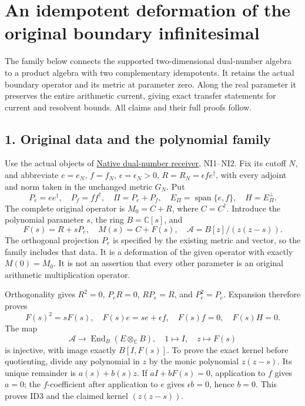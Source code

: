 \documentclass[
]{article}
\author{}
\date{}
\begin{document}
{
\setcounter{tocdepth}{3}
\tableofcontents
}
\section{An idempotent deformation of the original boundary
infinitesimal}\label{an-idempotent-deformation-of-the-original-boundary-infinitesimal}

The family below connects the supported two-dimensional dual-number
algebra to a product algebra with two complementary idempotents. It
retains the actual boundary operator and its metric at parameter zero.
Along the real parameter it preserves the entire arithmetic current,
giving exact transfer statements for current and resolvent bounds. All
claims and their full proofs follow.

\subsection{1. Original data and the polynomial
family}\label{original-data-and-the-polynomial-family}

Use the actual objects of
\href{https://github.com/KokunoYumeto/zeta-function-research-reader/blob/6af54ea3c8ef99127af327f3103e086c68d482c2/workbenches/splitzero-tandem/branches/identity-absorber-square/NATIVE_DUAL_NUMBER_RECEIVER.md}{Native
dual-number receiver}, NI1--NI2. Fix its cutoff \(N\), and abbreviate
\(e=e_N\), \(f=f_N\), \(\epsilon=\epsilon_N>0\),
\(R=R_N=\epsilon fe^\dagger\), with every adjoint and norm taken in the
unchanged metric \(G_N\). Put \[
P_e=ee^\dagger,\quad P_f=ff^\dagger,\quad
\Pi=P_e+P_f,\quad E_\Pi=\operatorname{span}\{e,f\},\quad H=E_\Pi^\perp.
\] The complete original operator is \(M_0=C+R\), where \(C=C^\dagger\).
Introduce the polynomial parameter \(s\), the ring \(B=\mathbb C[s]\),
and \[
F(s)=R+sP_e,\quad M(s)=C+F(s),\quad
\mathcal A=B[z]/(z(z-s)).
\tag{ID1}
\] The orthogonal projection \(P_e\) is specified by the existing metric
and vector, so the family includes that data. It is a deformation of the
given operator with exactly \(M(0)=M_0\). It is not an assertion that
every other parameter is an original arithmetic multiplication operator.

Orthogonality gives \(R^2=0\), \(P_eR=0\), \(RP_e=R\), and
\(P_e^2=P_e\). Expansion therefore proves \[
F(s)^2=sF(s),\quad F(s)e=se+\epsilon f,
\quad F(s)f=0,\quad F(s)H=0.
\tag{ID2}
\] The map \[
\mathcal A\longrightarrow\operatorname{End}_B(E\otimes_{\mathbb C}B),
\quad 1\longmapsto I,\quad z\longmapsto F(s)
\tag{ID3}
\] is injective, with image exactly \(B[I,F(s)]\). To prove the exact
kernel before quotienting, divide any polynomial in \(z\) by the monic
polynomial \(z(z-s)\). Its unique remainder is \(a(s)+b(s)z\). If
\(aI+bF(s)=0\), application to \(f\) gives \(a=0\); the
\(f\)-coefficient after application to \(e\) gives \(\epsilon b=0\),
hence \(b=0\). This proves ID3 and the claimed kernel \((z(z-s))\).
\end{document}
